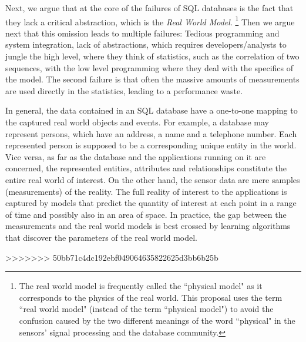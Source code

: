 {Next, we argue that at the core of the failures of SQL databases is the fact that they lack a critical abstraction, which is the {\em Real World Model}.%
\footnote{The real world model is frequently called the ``physical model" as it corresponds to the physics of the real world. This proposal uses the term ``real world model" (instead of the term ``physical model") to avoid the confusion caused by the two different meanings of the word ``physical" in the sensors' signal processing and the database community.
}
Then we argue next that this omission leads to multiple failures: Tedious programming and system integration, lack of abstractions, which requires developers/analysts to jungle the high level, where they think of statistics, such as the correlation of two sequences, with the low level programming where they deal with the specifics of the model. The second failure is that often the massive amounts of measurements are used directly in the statistics, leading to a performance waste.

In general, the data contained in an SQL database have a one-to-one mapping to the captured real world objects and events. For example, a database may represent persons, which have an address, a name and a telephone number. Each represented person is supposed to be a corresponding unique entity in the world. Vice versa, as far as the database and the applications running on it are concerned, the represented entities, attributes and relationships constitute the entire real world of interest. On the other hand, the sensor data are mere samples (measurements) of the reality. The full reality of interest to the applications is captured by models that predict the quantity of interest at each point in a range of time and possibly also in an area of space. In practice, the gap between the measurements and the real world models is best crossed by learning algorithms that discover the parameters of the real world model. 

>>>>>>> 50bb71c4dc192ebf049064635822625d3bb6b25b

}
